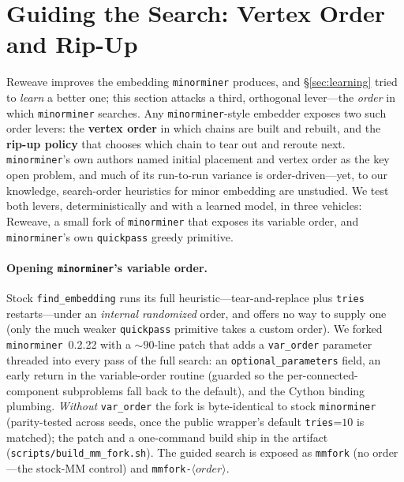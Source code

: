 \documentclass[acmsmall,anonymous,nonacm]{acmart}
\begin{document}
\section{Guiding the Search: Vertex Order and Rip-Up}
\label{sec:searchguide}

Reweave improves the embedding \texttt{minorminer} produces, and \S\ref{sec:learning}
tried to \emph{learn} a better one; this section attacks a third, orthogonal lever---the
\emph{order} in which \texttt{minorminer} searches. Any \texttt{minorminer}-style
embedder exposes two such order levers: the \textbf{vertex order} in which chains are
built and rebuilt, and the \textbf{rip-up policy} that chooses which chain to tear out
and reroute next. \texttt{minorminer}'s own authors named initial placement and vertex
order as the key open problem, and much of its run-to-run variance is order-driven---yet,
to our knowledge, search-order heuristics for minor embedding are unstudied. We test both levers, deterministically and
with a learned model, in three vehicles: Reweave, a small fork of
\texttt{minorminer} that exposes its variable order, and \texttt{minorminer}'s own
\texttt{quickpass} greedy primitive.

\paragraph{Opening \texttt{minorminer}'s variable order.}
Stock \texttt{find\_embedding} runs its full heuristic---tear-and-replace plus
\texttt{tries} restarts---under an \emph{internal randomized} order, and offers no
way to supply one (only the much weaker \texttt{quickpass} primitive takes a custom
order). We forked \texttt{minorminer}~0.2.22 with a ${\sim}90$-line patch that adds
a \texttt{var\_order} parameter threaded into every pass of the full search: an
\texttt{optional\_parameters} field, an early return in the variable-order routine
(guarded so the per-connected-component subproblems fall back to the default), and
the Cython binding plumbing. \emph{Without} \texttt{var\_order} the fork is
byte-identical to stock \texttt{minorminer} (parity-tested across seeds, once the
public wrapper's default \texttt{tries}{=}$10$ is matched); the patch and a
one-command build ship in the artifact (\texttt{scripts/build\_mm\_fork.sh}). The
guided search is exposed as \texttt{mmfork} (no order---the stock-MM control) and
\texttt{mmfork-}$\langle\textit{order}\rangle$.
\end{document}
